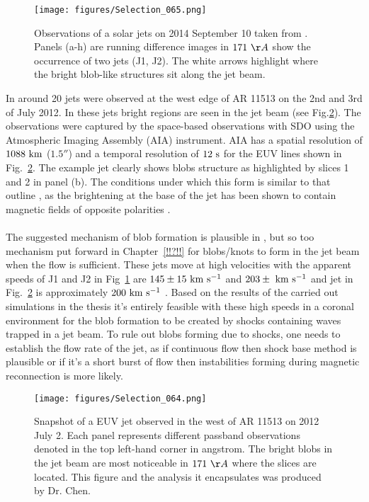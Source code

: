 \documentclass[12pt]{ociamthesis}
\newcommand{\kms}{~\rm{km ~s^{-1}}}
\newcommand{\np}{\\ \\}
\begin{document}
%
\begin{figure*}[h]
\begin{centering}
\texttt{[image: figures/Selection\_065.png]}
\caption{Observations of a solar jets on  2014 September 10 taken from \cite{Zhang2016SoPh291859Z}. Panels (a-h) are running difference images in $171~\AA$ show the occurrence of two jets (J1, J2). The white arrows highlight where the bright blob-like structures sit along the jet beam.}
\label{fig_brigt_blobs_2} 
\end{centering}
\end{figure*}
%
In \cite{Chen2015ApJ81571C, Chen2017ApJ84054C} around 20 jets were observed at the west edge of AR 11513 on the 2nd and 3rd of July 2012. In these jets bright regions are seen in the jet beam (see Fig.\ref{fig_brigt_blobs_alt}). The observations were captured by the space-based observations with SDO using the Atmospheric Imaging Assembly (AIA) instrument. AIA has a spatial resolution of $1088~\rm{km}$ ($\ang{;;1.5}$) and a temporal resolution of $12~\rm{s}$ for the EUV lines shown in Fig.~\ref{fig_brigt_blobs_alt}. The example jet clearly shows blobs structure as highlighted by slices 1 and 2 in panel (b). The conditions under which this form is similar to that outline \cite{Zhang2014AA567A11Z, Zhang2016SoPh291859Z}, as the brightening at the base of the jet has been shown to contain magnetic fields of opposite polarities \citep{Chen2017ApJ84054C}. \np
%
The suggested mechanism of blob formation is plausible in \cite{Zhang2016SoPh291859Z}, but so too mechanism put forward in Chapter~\ref{!!?!!} for blobs/knots to form in the jet beam when the flow is sufficient. These jets move at high velocities with the apparent speeds of J1 and J2 in Fig~\ref{fig_brigt_blobs_2} are $145\pm15\kms$ and $203\pm\kms$ \citep{Zhang2016SoPh291859Z} and jet in Fig.~\ref{fig_brigt_blobs_alt} is approximately $200\kms$ \citep{Chen2017ApJ84054C}. Based on the results of the carried out simulations in the thesis it's entirely feasible with these high speeds in a coronal environment for the blob formation to be created by shocks containing waves trapped in a jet beam. To rule out blobs forming due to shocks, one needs to establish the flow rate of the jet, as if continuous flow then shock base method is plausible or if it’s a short burst of flow then instabilities forming during magnetic reconnection is more likely.
\begin{figure*}[h]
\begin{centering}
\texttt{[image: figures/Selection\_064.png]}
\caption{Snapshot of a EUV jet observed in the west of AR 11513 on 2012 July 2. Each panel represents different passband observations denoted in the top left-hand corner in angstrom. The bright blobs in the jet beam are most noticeable in $171~\AA$ where the slices are located. This figure and the analysis it encapsulates was produced by Dr. Chen.}
\label{fig_brigt_blobs_alt} 
\end{centering}
\end{figure*}
\end{document}
